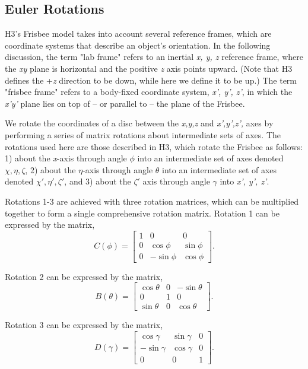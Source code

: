 \documentclass[a4paper,12pt, oneside]{article}
\begin{document}
\subsection{Euler Rotations} 

H3's Frisbee model takes into account several reference frames, which are coordinate systems that describe an object's orientation.  In the following discussion, the term "lab frame" refers to an inertial \textit{x, y, z} reference frame, where the \textit{xy} plane is horizontal and the positive \textit{z} axis points upward.  (Note that H3 defines the +\textit{z} direction to be down, while here we define it to be up.) The term "frisbee frame" refers to a body-fixed coordinate system, \textit{x', y', z'}, in which the \textit{x'y'} plane lies on top of -- or parallel to -- the plane of the Frisbee.

We rotate the coordinates of a disc between the \textit{x,y,z} and \textit{x',y',z',} axes by performing a series of matrix rotations about intermediate sets of axes.  The rotations used here are those described in H3, which rotate the Frisbee as follows: 1) about the \textit{x}-axis through angle $\phi$ into an intermediate set of axes denoted $\chi,\eta,\zeta$, 2) about the $\eta$-axis through angle $\theta$ into an intermediate set of axes denoted $\chi',\eta',\zeta'$, and 3) about the $\zeta'$ axis through angle $\gamma$ into \textit{x', y', z'}.

Rotations 1-3 are achieved with three rotation matrices, which can be multiplied together to form a single comprehensive rotation matrix. Rotation 1 can be expressed by the matrix,
\begin{equation*}
C(\phi)=\begin{bmatrix}
1 & 0 & 0 \\
0 & \cos\phi & \sin\phi \\
0 & -\sin\phi & \cos\phi
\end{bmatrix}.
\end{equation*}

Rotation 2 can be expressed by the matrix, 
\begin{equation*}
B(\theta)=\begin{bmatrix}
\cos\theta & 0 & -\sin\theta \\
0 & 1 & 0 \\
\sin\theta & 0 & \cos\theta
\end{bmatrix}.
\end{equation*}

Rotation 3 can be expressed by the matrix, 
\begin{equation*}
D(\gamma)=\begin{bmatrix}
\cos\gamma & \sin\gamma & 0 \\
-\sin\gamma & \cos\gamma & 0 \\
0 & 0 & 1
\end{bmatrix}.
\end{equation*}
\end{document}
